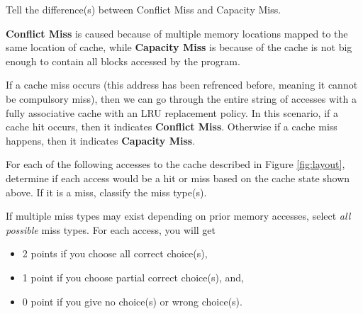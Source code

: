 \begin{questions}
{}

\newpage

\question[3] Tell the difference(s) between Conflict Miss and
Capacity Miss.
{

    \begin{solution}
            
            
            \textbf{Conflict Miss} is caused because of multiple memory locations mapped to the same location of cache, while \textbf{Capacity Miss} is because of the cache is not big enough to contain all blocks accessed by the program.

            If a cache miss occurs (this address has been refrenced before, meaning it cannot be compulsory miss), then we can go through the entire string of accesses with a fully associative cache with an LRU replacement policy. In this scenario, if a cache hit occurs, then it indicates \textbf{Conflict Miss}. Otherwise if a cache miss happens, then it indicates \textbf{Capacity Miss}.

    \end{solution}

}


\question[12] For each of the following accesses to the cache
described in Figure \ref{fig:layout}, determine if each
access would be a hit or miss based on the cache state shown above.
If it is a miss, classify the miss type(s). \label{access_simulate}

If multiple miss types may exist depending on prior memory accesses,
select \emph{all possible} miss types. For each access, you will get
\begin{itemize}
    \item 2 points if you choose all correct choice(s),
    \item 1 point if you choose partial correct choice(s), and,
    \item 0 point if you give no choice(s) or wrong choice(s).
\end{itemize}


\end{questions}
